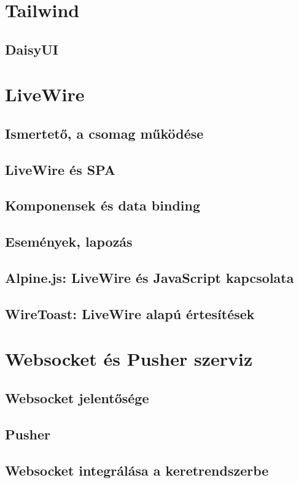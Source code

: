 \documentclass[
]{thesis-ekf}
\theoremstyle{definition}
\theoremstyle{remark}
\begin{document}
\section{Tailwind}
\subsection{DaisyUI}

\section{LiveWire}
\subsection{Ismertető, a csomag működése}
\subsection{LiveWire és SPA}
\subsection{Komponensek és data binding}
\subsection{Események, lapozás}
\subsection{Alpine.js: LiveWire és JavaScript kapcsolata}
\subsection{WireToast: LiveWire alapú értesítések}

\section{Websocket és Pusher szerviz}
\subsection{Websocket jelentősége}
\subsection{Pusher}
\subsection{Websocket integrálása a keretrendszerbe}
\end{document}
